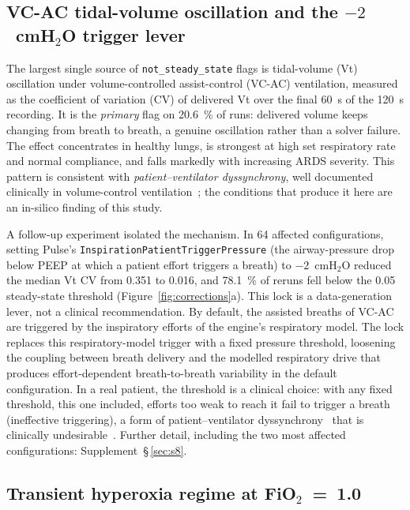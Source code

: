 \documentclass[pdflatex,sn-nature]{sn-jnl}%
\begin{document}
\subsection{\texorpdfstring{VC-AC tidal-volume oscillation and the $-2$~cmH$_2$O trigger lever}{VC-AC tidal-volume oscillation and the -2 cmH2O trigger lever}}\label{sec:results-vcac}

The largest single source of \texttt{not\_steady\_state} flags is tidal-volume (Vt) oscillation under volume-controlled assist-control (VC-AC) ventilation, measured as the coefficient of variation (CV) of delivered Vt over the final 60~s of the 120~s recording. It is the \emph{primary} flag on 20.6~\% of runs: delivered volume keeps changing from breath to breath, a genuine oscillation rather than a solver failure. The effect concentrates in healthy lungs, is strongest at high set respiratory rate and normal compliance, and falls markedly with increasing ARDS severity. This pattern is consistent with \emph{patient--ventilator dyssynchrony}, well documented clinically in volume-control ventilation~\cite{figueroacasas2016}; the conditions that produce it here are an in-silico finding of this study.

A follow-up experiment isolated the mechanism. In 64 affected configurations, setting Pulse's \texttt{InspirationPatientTriggerPressure} (the airway-pressure drop below PEEP at which a patient effort triggers a breath) to $-2$~cmH$_2$O reduced the median Vt CV from 0.351 to 0.016, and 78.1~\% of reruns fell below the 0.05 steady-state threshold (Figure~\ref{fig:corrections}a). This lock is a data-generation lever, not a clinical recommendation. By default, the assisted breaths of VC-AC are triggered by the inspiratory efforts of the engine's respiratory model. The lock replaces this respiratory-model trigger with a fixed pressure threshold, loosening the coupling between breath delivery and the modelled respiratory drive that produces effort-dependent breath-to-breath variability in the default configuration. In a real patient, the threshold is a clinical choice: with any fixed threshold, this one included, efforts too weak to reach it fail to trigger a breath (ineffective triggering), a form of patient--ventilator dyssynchrony~\cite{thille2006} that is clinically undesirable~\cite{blanch2015}. Further detail, including the two most affected configurations: Supplement~\S\,\ref{sec:s8}.

\subsection{\texorpdfstring{Transient hyperoxia regime at FiO$_2$~=~1.0}{Transient hyperoxia regime at FiO2 = 1.0}}\label{sec:results-hyperoxia}
\end{document}
